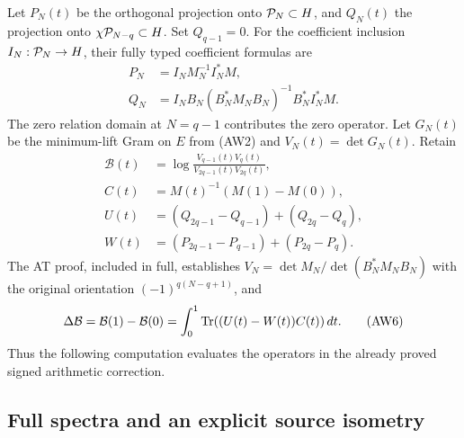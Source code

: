 Let $P_N(t)$ be the orthogonal projection onto $\mathcal P_N\subset H$,
and $Q_N(t)$ the projection onto $\chi\mathcal P_{N-q}\subset H$.
Set $Q_{q-1}=0$. For the coefficient inclusion $I_N:\mathcal P_N\to H$,
their fully typed coefficient formulas are
\[
 \begin{aligned}
 P_N&=I_NM_N^{-1}I_N^*M,\\
 Q_N&=I_NB_N(B_N^*M_NB_N)^{-1}B_N^*I_N^*M.
 \end{aligned}
 \tag{AW4}
\]
The zero relation domain at $N=q-1$ contributes the zero operator.
Let $G_N(t)$ be the minimum-lift Gram on $E$ from (AW2) and
$V_N(t)=\det G_N(t)$. Retain
\[
 \begin{aligned}
 \mathcal B(t)&=\log\frac{V_{q-1}(t)V_q(t)}
                              {V_{2q-1}(t)V_{2q}(t)},\\
 C(t)&=M(t)^{-1}(M(1)-M(0)),\\
 U(t)&=(Q_{2q-1}-Q_{q-1})+(Q_{2q}-Q_q),\\
 W(t)&=(P_{2q-1}-P_{q-1})+(P_{2q}-P_q).
 \end{aligned}
 \tag{AW5}
\]
The AT proof, included in full, establishes
$V_N=\det M_N/\det(B_N^*M_NB_N)$ with the original orientation
$(-1)^{q(N-q+1)}$, and
\[
 \Delta\mathcal B=\mathcal B(1)-\mathcal B(0)
       =\int_0^1\operatorname{Tr}((U(t)-W(t))C(t))\,dt.
 \tag{AW6}
\]
Thus the following computation evaluates the operators in the
already proved signed arithmetic correction.

\subsection{Full spectra and an explicit source isometry}

